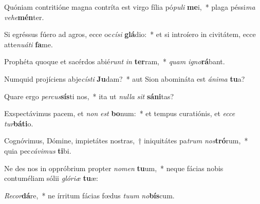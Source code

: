 \item Quóniam contritióne magna contríta est virgo fília pó\textit{pu}\textit{li} \textbf{me}i,~* plaga péssi\textit{ma} \textit{ve}\textit{he}\textbf{mén}ter.
\item Si egréssus fúero ad agros, ecce oc\textit{cí}\textit{si} \textbf{glá}dio:~* et si introíero in civitátem, ecce atte\textit{nu}\textit{á}\textit{ti} \textbf{fa}me.
\item Prophéta quoque et sacérdos abié\textit{runt} \textit{in} \textbf{ter}ram,~* \textit{quam} \textit{i}\textit{gno}\textbf{rá}bant.
\item Numquid projíciens abje\textit{cís}\textit{ti} \textbf{Ju}dam?~* aut Sion abomináta est \textit{á}\textit{ni}\textit{ma} \textbf{tu}a?
\item Quare ergo \textit{per}\textit{cus}\textbf{sís}ti nos,~* ita ut \textit{nul}\textit{la} \textit{sit} \textbf{sá}\textbf{ni}tas?
\item Exspectávimus pacem, et \textit{non} \textit{est} \textbf{bo}num:~* et tempus curatiónis, et \textit{ec}\textit{ce} \textit{tur}\textbf{bá}\textbf{ti}o.
\item Cognóvimus, Dómine, impietátes nostras,~† iniquitátes pa\textit{trum} \textit{nos}\textbf{tró}rum,~* quia pec\textit{cá}\textit{vi}\textit{mus} \textbf{ti}bi.
\item Ne des nos in oppróbrium propter \textit{no}\textit{men} \textbf{tu}um,~* neque fácias nobis contuméliam sólii \textit{gló}\textit{ri}\textit{æ} \textbf{tu}æ:
\item \textit{Re}\textit{cor}\textbf{dá}re,~* ne írritum fácias fœdus \textit{tu}\textit{um} \textit{no}\textbf{bís}cum.
